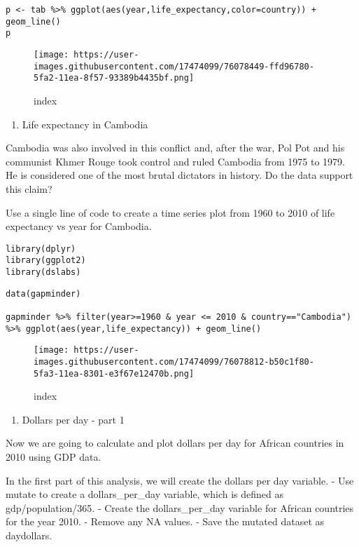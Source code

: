 \documentclass[]{article}
\providecommand{\tightlist}{%
  \setlength{\itemsep}{0pt}\setlength{\parskip}{0pt}}
\begin{document}
\begin{verbatim}
p <- tab %>% ggplot(aes(year,life_expectancy,color=country)) + geom_line()
p
\end{verbatim}

\begin{figure}
\centering
\texttt{[image: https://user-images.githubusercontent.com/17474099/76078449-ffd96780-5fa2-11ea-8f57-93389b4435bf.png]}
\caption{index}
\end{figure}

\begin{enumerate}
\def\labelenumi{\arabic{enumi}.}
\setcounter{enumi}{5}
\tightlist
\item
  Life expectancy in Cambodia
\end{enumerate}

Cambodia was also involved in this conflict and, after the war, Pol Pot
and his communist Khmer Rouge took control and ruled Cambodia from 1975
to 1979. He is considered one of the most brutal dictators in history.
Do the data support this claim?

Use a single line of code to create a time series plot from 1960 to 2010
of life expectancy vs year for Cambodia.

\begin{verbatim}
library(dplyr)
library(ggplot2)
library(dslabs)
\end{verbatim}

\begin{verbatim}
data(gapminder)

gapminder %>% filter(year>=1960 & year <= 2010 & country=="Cambodia") %>% ggplot(aes(year,life_expectancy)) + geom_line()
\end{verbatim}

\begin{figure}
\centering
\texttt{[image: https://user-images.githubusercontent.com/17474099/76078812-b50c1f80-5fa3-11ea-8301-e3f67e12470b.png]}
\caption{index}
\end{figure}

\begin{enumerate}
\def\labelenumi{\arabic{enumi}.}
\setcounter{enumi}{6}
\tightlist
\item
  Dollars per day - part 1
\end{enumerate}

Now we are going to calculate and plot dollars per day for African
countries in 2010 using GDP data.

In the first part of this analysis, we will create the dollars per day
variable. - Use mutate to create a dollars\_per\_day variable, which is
defined as gdp/population/365. - Create the dollars\_per\_day variable
for African countries for the year 2010. - Remove any NA values. - Save
the mutated dataset as daydollars.
\end{document}
